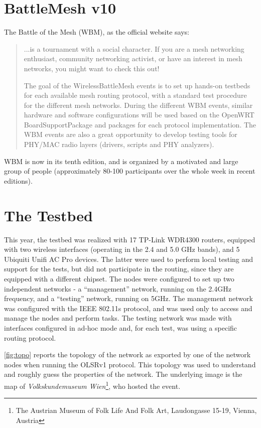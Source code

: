 \documentclass[10pt,onecolumn]{paper}
\begin{document}
\section{BattleMesh v10}
The Battle of the Mesh (WBM), as the official website says:
\begin{quote}
...is a tournament with a social character. If you are a mesh networking
enthusiast, community networking activist, or have an interest in mesh networks, 
you might want to check this out!

The goal of the WirelessBattleMesh events is to set up hands-on testbeds for each
available mesh routing protocol, with a standard test procedure for the different
mesh networks. During the different WBM events, similar hardware and software
configurations will be used based on the OpenWRT BoardSupportPackage and packages
for each protocol implementation. The WBM events are also a great opportunity to
develop testing tools for PHY/MAC radio layers (drivers, scripts and PHY
analyzers).
\end{quote}

WBM is now in its tenth edition, and is organized by a motivated and large group
of people (approximately 80-100 participants over the whole week in recent
editions). 

\section{The Testbed}
This year, the testbed was realized with 17 TP-Link WDR4300 routers, equipped
with two wireless interfaces (operating in the 2.4 and 5.0 GHz bands), and 5
Ubiquiti Unifi AC Pro devices. The latter were used to perform local testing and support
for the tests, but did not participate in the routing, since they are equipped
with a different chipset. The nodes were configured to set up two independent
networks - a ``management'' network, running on the 2.4GHz frequency, and a ``testing''
network, running on 5GHz. The management network was configured with the
IEEE 802.11s protocol, and was used only to access and manage the nodes and perform
tasks. The testing network was made with interfaces configured in ad-hoc mode
and, for each test, was using a specific routing protocol. 

\cref{fig:topo} reports the topology of the network as exported by one of the
network nodes when running the OLSRv1 protocol. This topology was used to
understand and roughly guess the properties of the network. The underlying image
is the map of \textit{Volkskundemuseum Wien}\footnote{The Austrian Museum of
Folk Life And Folk Art, Laudongasse 15-19, Vienna, Austria}, 
who hosted the event.
\end{document}
